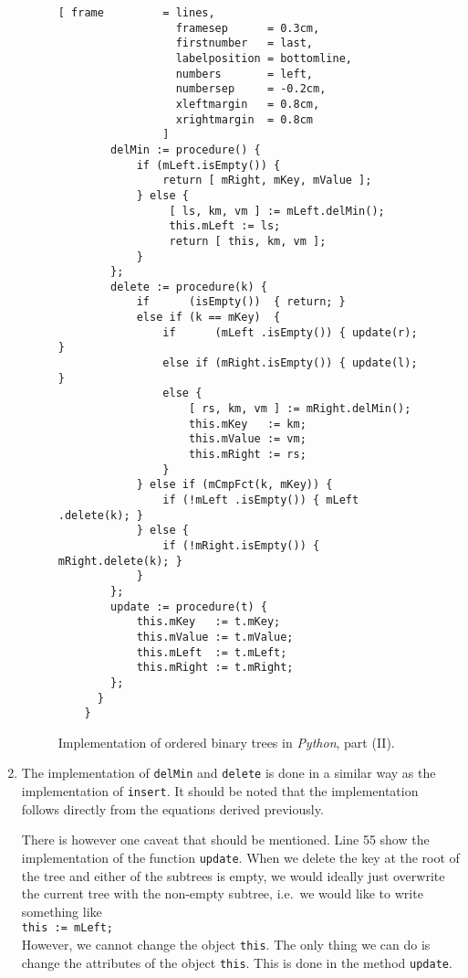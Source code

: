 \begin{enumerate}
\begin{figure}[!ht]
  \centering
\begin{Verbatim}[ frame         = lines, 
                  framesep      = 0.3cm, 
                  firstnumber   = last,
                  labelposition = bottomline,
                  numbers       = left,
                  numbersep     = -0.2cm,
                  xleftmargin   = 0.8cm,
                  xrightmargin  = 0.8cm
                ]
        delMin := procedure() {
            if (mLeft.isEmpty()) { 
                return [ mRight, mKey, mValue ]; 
            } else {
                 [ ls, km, vm ] := mLeft.delMin();
                 this.mLeft := ls;
                 return [ this, km, vm ];
            }
        };
        delete := procedure(k) {
            if      (isEmpty())  { return; } 
            else if (k == mKey)  {
                if      (mLeft .isEmpty()) { update(r); }  
                else if (mRight.isEmpty()) { update(l); } 
                else {
                    [ rs, km, vm ] := mRight.delMin();
                    this.mKey   := km;
                    this.mValue := vm; 
                    this.mRight := rs;
                }
            } else if (mCmpFct(k, mKey)) {
                if (!mLeft .isEmpty()) { mLeft .delete(k); }
            } else {
                if (!mRight.isEmpty()) { mRight.delete(k); }
            }
        };
        update := procedure(t) {
            this.mKey   := t.mKey;
            this.mValue := t.mValue;
            this.mLeft  := t.mLeft;
            this.mRight := t.mRight;
        };
      }
    }
\end{Verbatim}
\vspace*{-0.3cm}
  \caption{Implementation of ordered binary trees in \textsl{Python}, part (II).}
  \label{fig:binary-tree.stlx-2}
\end{figure}

\item The implementation of \texttt{delMin} and \texttt{delete} is done in a similar way as the
      implementation of \texttt{insert}.  It should be noted that the implementation follows directly from the
      equations derived  previously. 
      
      There is however one caveat that should be mentioned.  Line 55 show the implementation of the
      function \texttt{update}.  When we delete the key at the root of the tree and either of the
      subtrees is empty, we would ideally just overwrite the current tree with the non-empty
      subtree, i.e.~we would like to write something like
      \\[0.2cm]
      \hspace*{1.3cm}
      \texttt{this := mLeft;}
      \\[0.2cm]
      However, we cannot change the object \texttt{this}.  The only thing we can do is change the
      attributes of the object \texttt{this}.  This is done in the method \texttt{update}.
\end{enumerate}

